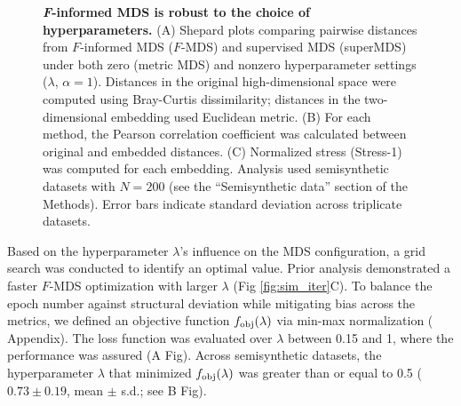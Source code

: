 \documentclass[10pt,letterpaper]{article}
\newcommand{\1}{{\rm 1}\kern-0.24em{\rm I}}
\begin{document}
\begin{figure}[h!]
    \centering
    \caption{\textbf{\textit{F}-informed MDS is robust to the choice of hyperparameters.} (A) Shepard plots comparing pairwise distances from $F$-informed MDS ($F$-MDS) and supervised MDS (superMDS) under both zero (metric MDS) and nonzero hyperparameter settings ($\lambda$, $\alpha=1$). Distances in the original high-dimensional space were computed using Bray-Curtis dissimilarity; distances in the two-dimensional embedding used Euclidean metric. (B) For each method, the Pearson correlation coefficient was calculated between original and embedded distances. (C) Normalized stress (Stress-1) was computed for each embedding. Analysis used semisynthetic datasets with $N=200$ (see the ``Semisynthetic data'' section of the Methods). Error bars indicate standard deviation across triplicate datasets.}
    \label{fig:mds_eval_sim}
\end{figure}


Based on the hyperparameter $\lambda$'s influence on the MDS configuration, a grid search was conducted to identify an optimal value. Prior analysis demonstrated a faster $F$-MDS optimization with larger $\lambda$ (Fig \ref{fig:sim_iter}C). To balance the epoch number against structural deviation while mitigating bias across the metrics, we defined an objective function $f_{\rm obj}(\lambda)$ via min-max normalization ( Appendix). The loss function was evaluated over $\lambda$ between 0.15 and 1, where the performance was assured (A Fig). Across semisynthetic datasets, the hyperparameter $\lambda$ that minimized $f_{\rm obj}(\lambda)$ was greater than or equal to 0.5 ($0.73\pm0.19$, mean $\pm$ s.d.; see B Fig).

 
\end{document}
